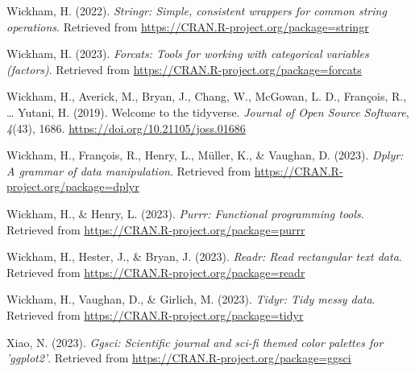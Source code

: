 \documentclass[
  man]{apa6}
\newlength{\cslhangindent}
\newlength{\cslentryspacingunit} %
\newenvironment{CSLReferences}[2] %
 {%
  \setlength{\parindent}{0pt}
  \ifodd #1
  \let\oldpar\par
  \def\par{\hangindent=\cslhangindent\oldpar}
  \fi
  \setlength{\parskip}{#2\cslentryspacingunit}
 }%
 {}
\begin{document}
\begin{CSLReferences}{1}{0}
\leavevmode{}%
Wickham, H. (2022). \emph{Stringr: Simple, consistent wrappers for common string operations}. Retrieved from \url{https://CRAN.R-project.org/package=stringr}

\leavevmode{}%
Wickham, H. (2023). \emph{Forcats: Tools for working with categorical variables (factors)}. Retrieved from \url{https://CRAN.R-project.org/package=forcats}

\leavevmode{}%
Wickham, H., Averick, M., Bryan, J., Chang, W., McGowan, L. D., François, R., \ldots{} Yutani, H. (2019). Welcome to the {tidyverse}. \emph{Journal of Open Source Software}, \emph{4}(43), 1686. \url{https://doi.org/10.21105/joss.01686}

\leavevmode{}%
Wickham, H., François, R., Henry, L., Müller, K., \& Vaughan, D. (2023). \emph{Dplyr: A grammar of data manipulation}. Retrieved from \url{https://CRAN.R-project.org/package=dplyr}

\leavevmode{}%
Wickham, H., \& Henry, L. (2023). \emph{Purrr: Functional programming tools}. Retrieved from \url{https://CRAN.R-project.org/package=purrr}

\leavevmode{}%
Wickham, H., Hester, J., \& Bryan, J. (2023). \emph{Readr: Read rectangular text data}. Retrieved from \url{https://CRAN.R-project.org/package=readr}

\leavevmode{}%
Wickham, H., Vaughan, D., \& Girlich, M. (2023). \emph{Tidyr: Tidy messy data}. Retrieved from \url{https://CRAN.R-project.org/package=tidyr}

\leavevmode{}%
Xiao, N. (2023). \emph{Ggsci: Scientific journal and sci-fi themed color palettes for 'ggplot2'}. Retrieved from \url{https://CRAN.R-project.org/package=ggsci}

\end{CSLReferences}
\end{document}

